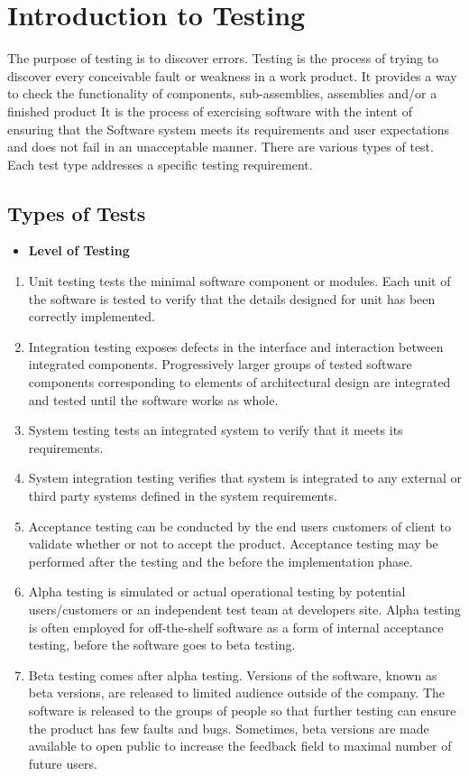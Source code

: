 \section{Introduction to Testing}
\hspace*{0.7in} The purpose of testing is to discover errors. Testing is the process of trying to discover every conceivable fault or weakness in a work product. It provides a way to check the functionality of components, sub-assemblies, assemblies and/or a finished product It is the process of exercising software with the intent of ensuring that the
Software system meets its requirements and user expectations and does not fail in an unacceptable manner. There are various types of test. Each test type addresses a specific testing requirement.
\subsection{Types of Tests}
\begin{itemize}
  \item \textbf{Level of Testing}
\end{itemize}
\begin{enumerate}
  \item Unit testing tests the minimal software component or modules. Each unit of the software is tested to verify that the details designed for unit has been correctly implemented.
  \item Integration testing exposes defects in the interface and interaction between integrated components. Progressively larger groups of tested software components corresponding to elements of architectural design are integrated and tested until the software works as whole.
  \item System testing tests an integrated system to verify that it meets its requirements.
  \item System integration testing verifies that system is integrated to any external or third party systems defined in the system requirements.
  \item Acceptance testing can be conducted by the end users customers of client to validate whether or not to accept the product. Acceptance testing may be performed after the testing and the before the implementation phase.
  \item Alpha testing is simulated or actual operational testing by potential users/customers or an independent test team at developers site. Alpha testing is often employed for off-the-shelf software as a form of internal acceptance testing, before the software goes to beta testing.
  \item Beta testing comes after alpha testing. Versions of the software, known as beta versions, are released to limited audience outside of the company. The software is released to the groups of people so that further testing can ensure the product has few faults and bugs. Sometimes, beta versions are made available to open public to increase the feedback field to maximal number of future users.
\end{enumerate}

